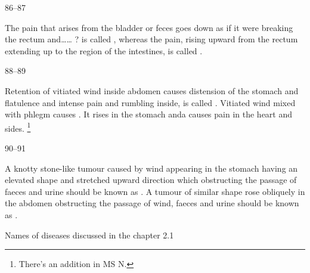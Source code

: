 \begin{translation}
\item[86--87]

	The pain that arises from the bladder or feces goes down as if it were
	breaking the rectum and…… ? is called , whereas the pain,
	rising upward from the rectum extending up to the region of the
	intestines, is called .

\item[88--89]

	Retention of vitiated wind inside abdomen causes distension of the
	stomach and flatulence and intense pain and rumbling inside, is called
	. Vitiated wind mixed with phlegm causes
	. It rises in the stomach anda causes pain in the heart
	and sides. \footnote{There’s an addition in MS N. }

\item[90--91]

	A knotty stone-like tumour caused by wind appearing in the stomach
	having an elevated shape and stretched upward direction which
	obstructing the passage of faeces and urine should be known as
	. A tumour of similar shape rose obliquely in the abdomen
	obstructing the passage of wind, faeces and urine should be known as
	. 


	Names of diseases discussed in the chapter 2.1

	   
	 
	 
	   




\end{translation}
